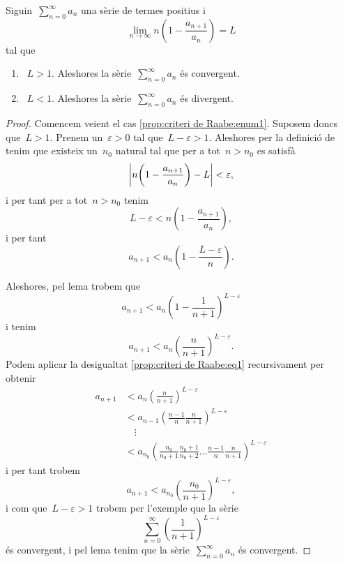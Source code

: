 \documentclass[../../main.tex]{subfiles}
\begin{document}
    \begin{proposition}
        \label{prop:criteri de Raabe}
        Siguin~\(\sum_{n=0}^{\infty}a_{n}\) una sèrie de termes positius i
        \[
            \lim_{n\to\infty}n\left(1-\frac{a_{n+1}}{a_{n}}\right)=L
        \]
        tal que
        \begin{enumerate}
        \item\label{prop:criteri de Raabe:enum1}~\(L>1\).
        Aleshores la sèrie~\(\sum_{n=0}^{\infty}a_{n}\) és convergent.
        \item\label{prop:criteri de Raabe:enum2}~\(L<1\).
        Aleshores la sèrie~\(\sum_{n=0}^{\infty}a_{n}\) és divergent.
        \end{enumerate}
        \begin{proof}
            Comencem veient el cas \eqref{prop:criteri de Raabe:enum1}.
            Suposem doncs que~\(L>1\).
            Prenem un~\(\varepsilon>0\) tal que~\(L-\varepsilon>1\).
            Aleshores per la definició de  tenim que existeix un~\(n_{0}\) natural tal que per a tot~\(n>n_{0}\) es satisfà
            \[
                \abs{n\left(1-\frac{a_{n+1}}{a_{n}}\right)-L}<\varepsilon,
            \]
            i per tant per a tot~\(n>n_{0}\) tenim
            \[
                L-\varepsilon<n\left(1-\frac{a_{n+1}}{a_{n}}\right),
            \]
            i per tant
            \[
                a_{n+1}<a_{n}\left(1-\frac{L-\varepsilon}{n}\right).
            \]

            Aleshores, pel lema  trobem que
            \[
                a_{n+1}<a_{n}\left(1-\frac{1}{n+1}\right)^{L-\varepsilon}
            \]
            i tenim
            \begin{equation}
                \label{prop:criteri de Raabe:eq1}
                a_{n+1}<a_{n}\left(\frac{n}{n+1}\right)^{L-\varepsilon}.
            \end{equation}
            Podem aplicar la desigualtat \eqref{prop:criteri de Raabe:eq1} recursivament per obtenir
            \begin{align*}
                a_{n+1}&<a_{n}\left(\frac{n}{n+1}\right)^{L-\varepsilon}\\
                &<a_{n-1}\left(\frac{n-1}{n}\frac{n}{n+1}\right)^{L-\varepsilon}\\
                &\quad\vdots\\
                &<a_{n_{0}}\left(\frac{n_{0}}{n_{0}+1}\frac{n_{0}+1}{n_{0}+2}\dots\frac{n-1}{n}\frac{n}{n+1}\right)^{L-\varepsilon}
            \end{align*}
            i per tant trobem
            \[
                a_{n+1}<a_{n_{0}}\left(\frac{n_{0}}{n+1}\right)^{L-\varepsilon},
            \]
            i com que~\(L-\varepsilon>1\) trobem per l'exemple  que la sèrie
            \[
                \sum_{n=0}^{\infty}\left(\frac{1}{n+1}\right)^{L-\varepsilon}
            \]
            és convergent, i pel lema  tenim que la sèrie~\(\sum_{n=0}^{\infty}a_{n}\) és convergent.


\end{proof}
\end{proposition}
\end{document}
